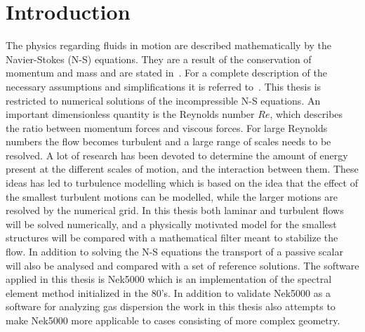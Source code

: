 
\chapter{Introduction} %

\label{introduction} %




The physics regarding fluids in motion are described mathematically by the Navier-Stokes (N-S) equations. 
They are a result of the conservation of momentum and mass and are stated in~. For a complete 
description of the necessary assumptions and simplifications it is referred to~\cite{White}.  
This thesis is restricted to numerical solutions of the incompressible N-S equations.
An important dimensionless quantity is the Reynolds number $Re$, which describes the ratio between 
momentum forces and viscous forces. For large Reynolds numbers the flow becomes turbulent and a 
large range of scales needs to be resolved. A lot of research has been devoted to determine the
amount of energy present at the different scales of motion, and the interaction between them. 
These ideas has led to turbulence modelling which is based on the 
idea that the effect of the smallest turbulent motions can be modelled, while 
the larger motions are resolved by the numerical grid. 
In this thesis both laminar and turbulent flows will be solved numerically, 
and a physically motivated model for the smallest structures will be compared
with a mathematical filter meant to stabilize the flow.
In addition to solving the N-S equations the 
transport of a passive scalar will also be analysed and compared with a set of reference solutions. 
The software applied in this thesis is Nek5000 which is an implementation of the spectral element method initialized in the 80's.
In addition to validate Nek5000 as a software for analyzing gas dispersion the work in this thesis 
also attempts to make Nek5000 more applicable to cases consisting of more complex geometry. 

